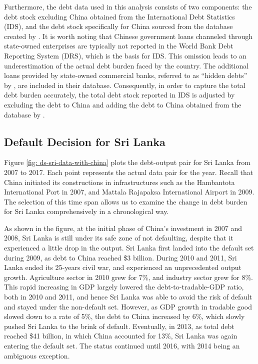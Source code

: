 Furthermore, the debt data used in this analysis consists of two components: the debt stock excluding China obtained from the International Debt Statistics (IDS), and the debt stock specifically for China sourced from the database created by \citet*{Horn-Reinhart-Trebesch-21}. It is worth noting that Chinese government loans channeled through state-owned enterprises are typically not reported in the World Bank Debt Reporting System (DRS), which is the basis for IDS. This omission leads to an underestimation of the actual debt burden faced by the country. The additional loans provided by state-owned commercial banks, referred to as ``hidden debts'' by \citet*{Horn-Reinhart-Trebesch-21}, are included in their database. Consequently, in order to capture the total debt burden accurately, the total debt stock reported in IDS is adjusted by excluding the debt to China and adding the debt to China obtained from the database by \citet*{Horn-Reinhart-Trebesch-21}.

\subsection*{Default Decision for Sri Lanka}

Figure \ref{fig: ds-sri-data-with-china} plots the debt-output pair for Sri Lanka from 2007 to 2017. Each point represents the actual data pair for the year. Recall that China initiated its constructions in infrastructures such as the Hambantota International Port in 2007, and Mattala Rajapaksa International Airport in 2009. The selection of this time span allows us to examine the change in debt burden for Sri Lanka comprehensively in a chronological way.

As shown in the figure, at the initial phase of China's investment in 2007 and 2008, Sri Lanka is still under its safe zone of not defaulting, despite that it experienced a little drop in the output. Sri Lanka first landed into the default set during 2009, as debt to China reached \$3 billion. During 2010 and 2011, Sri Lanka ended its 25-years civil war, and experienced an unprecedented output growth. Agriculture sector in 2010 grew for 7\%, and industry sector grew for 8\%. This rapid increasing in GDP largely lowered the debt-to-tradable-GDP ratio, both in 2010 and 2011, and hence Sri Lanka was able to avoid the risk of default and stayed under the non-default set. However, as GDP growth in tradable good slowed down to a rate of 5\%, the debt to China increased by 6\%, which slowly pushed Sri Lanka to the brink of default. Eventually, in 2013, as total debt reached \$41 billion, in which China accounted for 13\%, Sri Lanka was again entering the default set. The status continued until 2016, with 2014 being an ambiguous exception.

